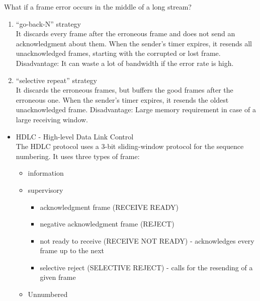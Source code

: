 \documentclass[margin=0px]{article}
\begin{document}
\begin{description}
\begin{description}
                What if a frame error occurs in the middle of a long stream?
                \begin{enumerate}
                    \item ``go-back-N'' strategy\\
                          It discards every frame after the erroneous frame and does not send an acknowledgment about them. When the sender's timer expires, it resends all unacknowledged frames, starting with the corrupted or lost frame. Disadvantage: It can waste a lot of bandwidth if the error rate is high.
                    \item ``selective repeat'' strategy \\
                          It discards the erroneous frames, but buffers the good frames after the erroneous one. When the sender's timer expires, it resends the oldest unacknowledged frame. Disadvantage: Large memory requirement in case of a large receiving window.
                \end{enumerate}

            \item[Examples of data link protocols] \hfill
                \begin{itemize}
                    \item HDLC - High-level Data Link Control \\
                          The HDLC protocol uses a 3-bit sliding-window protocol for the sequence numbering.
                          It uses three types of frame:
                          \begin{itemize}
                              \item information
                              \item supervisory
                                    \begin{itemize}
                                        \item acknowledgment frame (RECEIVE READY)
                                        \item negative acknowledgment frame (REJECT)
                                        \item not ready to receive (RECEIVE NOT READY) - acknowledges every frame up to the next
                                        \item selective reject (SELECTIVE REJECT) - calls for the resending of a given frame
                                    \end{itemize}
                              \item Unnumbered
                          \end{itemize}


\end{itemize}
\end{description}
\end{description}
\end{document}
